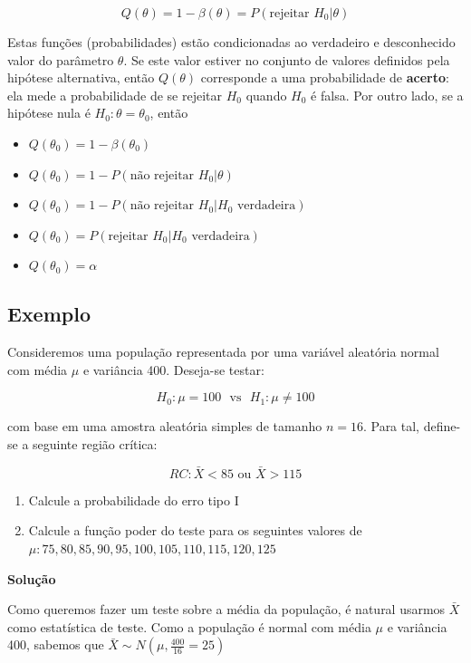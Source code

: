 \documentclass[
]{book}
\providecommand{\tightlist}{%
  \setlength{\itemsep}{0pt}\setlength{\parskip}{0pt}}
\begin{document}
\[Q(\theta)=1-\beta(\theta)=P(\text{rejeitar } H_0|\theta)\]

Estas funções (probabilidades) estão condicionadas ao verdadeiro e desconhecido valor do parâmetro \(\theta\). Se este valor estiver no conjunto de valores definidos pela hipótese alternativa, então \(Q(\theta)\) corresponde a uma probabilidade de \textbf{acerto}: ela mede a probabilidade de se rejeitar \(H_0\) quando \(H_0\) é falsa. Por outro lado, se a hipótese nula é \(H_0: \theta=\theta_0\), então

\begin{itemize}
\tightlist
\item
  \(Q(\theta_0)=1-\beta(\theta_0)\)
\item
  \(Q(\theta_0)=1-P(\text{não rejeitar } H_0|\theta)\)
\item
  \(Q(\theta_0)=1-P(\text{não rejeitar } H_0|H_0 \text{ verdadeira})\)
\item
  \(Q(\theta_0)=P(\text{rejeitar } H_0|H_0 \text{ verdadeira})\)
\item
  \(Q(\theta_0)=\alpha\)
\end{itemize}

\hypertarget{exemplo}{%
\subsection{Exemplo}\label{exemplo}}

Consideremos uma população representada por uma variável aleatória normal com média \(\mu\) e variância 400. Deseja-se testar:

\[H_0:\mu=100~~~\text{vs}~~~H_1: \mu \ne 100\]

com base em uma amostra aleatória simples de tamanho \(n=16\). Para tal, define-se a seguinte região crítica:

\[RC: \bar X < 85\text{ ou }\bar X > 115\]

\begin{enumerate}
\def\labelenumi{\arabic{enumi}.}
\tightlist
\item
  Calcule a probabilidade do erro tipo I
\item
  Calcule a função poder do teste para os seguintes valores de \(\mu: 75, 80, 85, 90, 95, 100, 105, 110, 115, 120, 125\)
\end{enumerate}

\textbf{Solução}

Como queremos fazer um teste sobre a média da população, é natural usarmos \(\bar X\) como estatística de teste. Como a população é normal com média \(\mu\) e variância 400, sabemos que \(\bar X\sim N(\mu,\frac{400}{16}=25)\)
\end{document}

